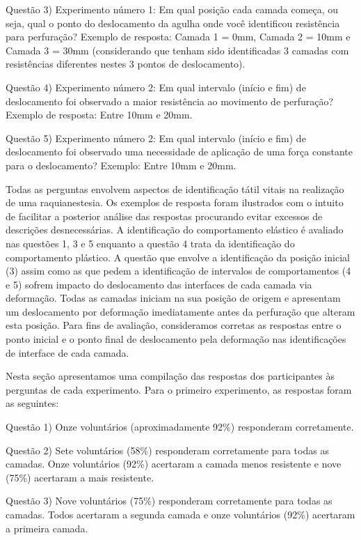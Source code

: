 Questão 3) Experimento número 1: Em qual posição cada camada começa, ou seja, qual o ponto do deslocamento da agulha onde você identificou resistência para perfuração? 
Exemplo de resposta: Camada 1 = 0mm, Camada 2 = 10mm e Camada 3 = 30mm (considerando que tenham sido identificadas 3 camadas com resistências diferentes nestes 3 pontos de deslocamento).

Questão 4) Experimento número 2: Em qual intervalo (início e fim) de deslocamento foi observado a maior resistência ao movimento de perfuração? 
Exemplo de resposta: Entre 10mm e 20mm.

Questão 5) Experimento número 2: Em qual intervalo (início e fim) de deslocamento foi observado uma necessidade de aplicação de uma força constante para o deslocamento? 
Exemplo: Entre 10mm e 20mm.

Todas as perguntas envolvem aspectos de identificação tátil vitais na realização de uma raquianestesia. Os exemplos de resposta foram ilustrados com o intuito de facilitar a posterior análise das respostas procurando evitar excessos de descrições desnecessárias. A identificação do comportamento elástico é avaliado nas questões 1, 3 e 5 enquanto a questão 4 trata da identificação do comportamento plástico. A questão que envolve a identificação da posição inicial (3) assim como as que pedem a identificação de intervalos de comportamentos (4 e 5) sofrem impacto do deslocamento das interfaces de cada camada via deformação. Todas as camadas iniciam na sua posição de origem e apresentam um deslocamento por deformação imediatamente antes da perfuração que alteram esta posição. Para fins de avaliação, consideramos corretas as respostas entre o ponto inicial e o ponto final de deslocamento pela deformação nas identificações de interface de cada camada.  

\label{sec:respostas}

Nesta seção apresentamos uma compilação das respostas dos participantes às perguntas de cada experimento. Para o primeiro
experimento, as respostas foram as seguintes:

Questão 1) Onze voluntários (aproximadamente 92\%) responderam corretamente.

Questão 2) Sete voluntários (58\%) responderam corretamente para todas as camadas. Onze voluntários (92\%) acertaram a camada menos resistente e nove (75\%) acertaram a mais resistente.

Questão 3) Nove voluntários (75\%) responderam corretamente para todas as camadas. Todos acertaram a segunda camada e onze voluntários (92\%) acertaram a primeira camada. 

